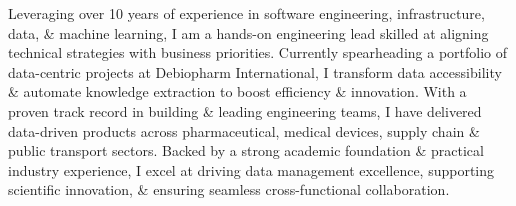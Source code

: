 

\begin{cvparagraph}

Leveraging over 10 years of experience in software engineering, infrastructure, data, \& machine learning, I am a hands-on engineering lead skilled at aligning technical strategies with business priorities. 
Currently spearheading a portfolio of data-centric projects at Debiopharm International, I transform data accessibility \& automate knowledge extraction to boost efficiency \& innovation. 
With a proven track record in building \& leading engineering teams, I have delivered data-driven products across pharmaceutical, medical devices, supply chain \& public transport sectors.
Backed by a strong academic foundation \& practical industry experience, I excel at driving data management excellence, supporting scientific innovation, \& ensuring seamless cross-functional collaboration.
\end{cvparagraph}

\vspace{-0.5cm}
